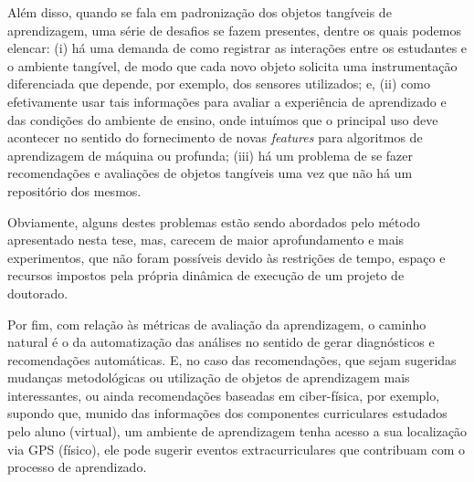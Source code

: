 
Além disso, quando se fala em padronização dos objetos tangíveis de aprendizagem, uma série de desafios se fazem presentes, dentre os quais podemos elencar: (i) há uma demanda de como registrar as interações entre os estudantes e o ambiente tangível, de modo que cada novo objeto solicita uma instrumentação diferenciada que depende, por exemplo, dos sensores utilizados; e, (ii) como efetivamente usar tais informações para avaliar a experiência de aprendizado e das condições do ambiente de ensino, onde intuímos que o principal uso deve acontecer no sentido do fornecimento de novas \textit{features} para algoritmos de aprendizagem de máquina ou profunda; (iii) há um problema de se fazer recomendações e avaliações de objetos tangíveis uma vez que não há um repositório dos mesmos.

Obviamente, alguns destes problemas estão sendo abordados pelo método apresentado nesta tese, mas, carecem de maior aprofundamento e mais experimentos, que não foram possíveis devido às restrições de tempo, espaço e recursos impostos pela própria dinâmica de execução de um projeto de doutorado. 

Por fim, com relação às métricas de avaliação da aprendizagem, o caminho natural é o da automatização das análises no sentido de gerar diagnósticos e recomendações automáticas. E, no caso das recomendações, que sejam sugeridas mudanças metodológicas ou utilização de objetos de aprendizagem mais interessantes, ou ainda recomendações baseadas em ciber-física, por exemplo, supondo que, munido das informações dos componentes curriculares estudados pelo aluno (virtual), um ambiente de aprendizagem tenha acesso a sua localização via GPS (físico), ele pode sugerir eventos extracurriculares que contribuam com o processo de aprendizado.